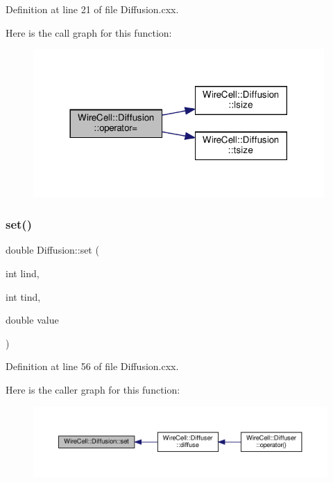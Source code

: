 Definition at line 21 of file Diffusion.\+cxx.

Here is the call graph for this function\+:
\nopagebreak
\begin{figure}[H]
\begin{center}
\leavevmode
\includegraphics[width=314pt]{class_wire_cell_1_1_diffusion_a245502cf5fcf7e278504f55263668a13_cgraph}
\end{center}
\end{figure}
\mbox{\label{class_wire_cell_1_1_diffusion_a18df718cd15d36f105c5eb2f4039b320}} 
\subsubsection{\texorpdfstring{set()}{set()}}
{\footnotesize\ttfamily double Diffusion\+::set (\begin{DoxyParamCaption}\item[{int}]{lind,  }\item[{int}]{tind,  }\item[{double}]{value }\end{DoxyParamCaption})\hspace{0.3cm}{\ttfamily [virtual]}}



Definition at line 56 of file Diffusion.\+cxx.

Here is the caller graph for this function\+:
\nopagebreak
\begin{figure}[H]
\begin{center}
\leavevmode
\includegraphics[width=350pt]{class_wire_cell_1_1_diffusion_a18df718cd15d36f105c5eb2f4039b320_icgraph}
\end{center}
\end{figure}
\mbox{\label{class_wire_cell_1_1_diffusion_a86e78fa0c302bbbd2e1329b3f0294454}} 
